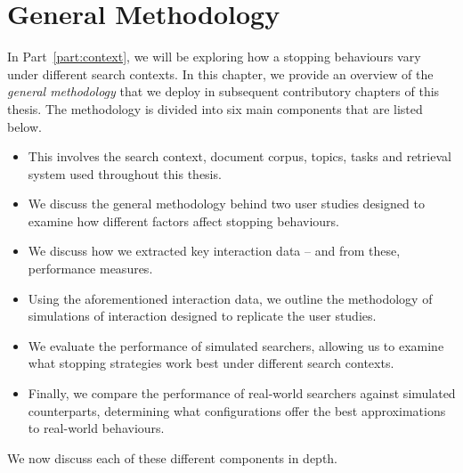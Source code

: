 
\chapter[General Methodology]{General Methodology}\label{chap:method}
In Part~\ref{part:context}, we will be exploring how a stopping behaviours vary under different search contexts. In this chapter, we provide an overview of the \emph{general methodology} that we deploy in subsequent contributory chapters of this thesis. The methodology is divided into six main components that are listed below.

\begin{itemize}
    \item{ This involves the search context, document corpus, topics, tasks and retrieval system used throughout this thesis.}
    \item{ We discuss the general methodology behind two user studies designed to examine how different factors affect stopping behaviours.}
    \item{ We discuss how we extracted key interaction data -- and from these, performance measures.}
    \item{ Using the aforementioned interaction data, we outline the methodology of simulations of interaction designed to replicate the user studies.}
    \item{ We evaluate the performance of simulated searchers, allowing us to examine what stopping strategies work best under different search contexts.}
    \item{ Finally, we compare the performance of real-world searchers against simulated counterparts, determining what configurations offer the best approximations to real-world behaviours.}
\end{itemize}

We now discuss each of these different components in depth.



